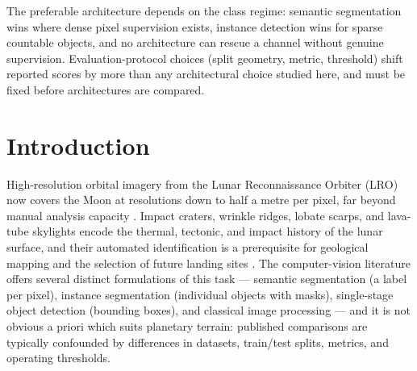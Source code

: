 \documentclass{aa}
\begin{document}
     {The preferable architecture depends on the class regime: semantic segmentation wins where dense pixel supervision exists, instance detection wins for sparse countable objects, and no architecture can rescue a channel without genuine supervision. Evaluation-protocol choices (split geometry, metric, threshold) shift reported scores by more than any architectural choice studied here, and must be fixed before architectures are compared.}



   \maketitle



\section{Introduction}
\label{sec:introduction}

High-resolution orbital imagery from the Lunar Reconnaissance Orbiter (LRO) now covers the Moon at resolutions down to half a metre per pixel, far beyond manual analysis capacity \citep{lroc_usgs}. Impact craters, wrinkle ridges, lobate scarps, and lava-tube skylights encode the thermal, tectonic, and impact history of the lunar surface, and their automated identification is a prerequisite for geological mapping and the selection of future landing sites \citep{pia12954,nasa2023southpole}. The computer-vision literature offers several distinct formulations of this task --- semantic segmentation (a label per pixel), instance segmentation (individual objects with masks), single-stage object detection (bounding boxes), and classical image processing --- and it is not obvious a priori which suits planetary terrain: published comparisons are typically confounded by differences in datasets, train/test splits, metrics, and operating thresholds.
\end{document}
